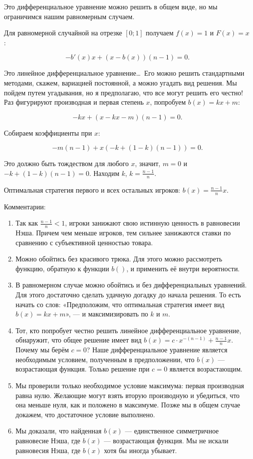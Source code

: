 \begin{enumerate}
Это дифференциальное уравнение можно решить в общем виде, но мы ограничимся нашим равномерным случаем.

Для равномерной случайной на отрезке $ [0;1] $ получаем $ f(x)=1 $ и $ F(x)=x $:

\begin{equation}
-b'(x)x+(x-b(x))(n-1)=0.
\end{equation}

Это линейное дифференциальное уравнение\ldots~Его можно решить стандартными методами, скажем, вариацией постоянной, а можно угадать вид решения. Мы пойдем путем угадывания, но я предполагаю, что все могут решить его честно! Раз фигурируют производная и первая степень $ x $, попробуем $b(x)=kx+m $:

\begin{equation}
-kx+(x-kx-m)(n-1)=0.
\end{equation}

Собираем коэффициенты при $ x $:

\begin{equation}
-m(n-1)+x(-k+(1-k)(n-1))=0.
\end{equation}

Это должно быть тождеством для любого $ x $, значит, $ m=0 $ и  $-k+(1-k)(n-1)=0$. Находим $ k $, $ k=\frac{n-1}{n} $.

Оптимальная стратегия первого и всех остальных игроков: $ b(x)=\frac{n-1}{n}x $.


Комментарии:

\begin{enumerate}
\item Так как $ \frac{n-1}{n}<1 $, игроки занижают свою истинную ценность в равновесии Нэша. Причем чем меньше игроков, тем сильнее занижаются ставки по сравнению с субъективной ценностью товара.
\item Можно обойтись без красивого трюка. Для этого можно рассмотреть функцию, обратную к функции $b()$, и применить её внутри вероятности.
\item В равномерном случае можно обойтись и без дифференциальных уравнений. Для этого достаточно сделать удачную догадку до начала решения. То есть начать со слов: «Предположим, что оптимальная стратегия имеет вид $ b(x)=kx+m $», — и максимизировать по $k$ и $m$.
\item Тот, кто попробует честно решить линейное дифференциальное уравнение, обнаружит, что общее решение имеет вид $ b(x)=c\cdot x^{-(n-1)}+\frac{n-1}{n}x $. Почему мы берём $ c=0 $? Наше дифференциальное уравнение является необходимым условием, полученным в предположении, что $ b(x) $ — возрастающая функция. Только решение при $ c=0 $ является возрастающим.
\item Мы проверили только необходимое условие максимума: первая производная равна нулю. Желающие могут взять вторую производную и убедиться, что она меньше нуля, как и положено в максимуме. Позже мы в общем случае докажем, что достаточное условие выполнено.
\item Мы доказали, что найденная $ b(x) $ — единственное симметричное равновесие Нэша, где $ b(x) $ — возрастающая функция. Мы не искали равновесия Нэша, где $ b(x) $ хотя бы иногда убывает.
\end{enumerate}



\end{enumerate}
